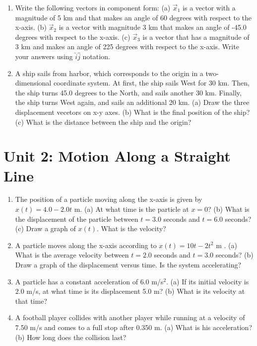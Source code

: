\documentclass[10pt]{article}
\begin{document}
\begin{enumerate}
\item Write the following vectors in component form: (a) $\vec{x}_1$ is a vector with a magnitude of 5 km and that makes an angle of 60 degrees with respect to the x-axis. (b) $\vec{x}_2$ is a vector with magnitude 3 km that makes an angle of -45.0 degrees with respect to the x-axis. (c) $\vec{x}_3$ is a vector that has a magnitude of 3 km and makes an angle of 225 degrees with respect to the x-axis.  Write your answers using $\hat{i} \hat{j}$ notation.  \\ \vspace{3cm}
\item A ship sails from harbor, which corresponds to the origin in a two-dimensional coordinate system.  At first, the ship sails West for 30 km.  Then, the ship turns 45.0 degrees to the North, and sails another 30 km.  Finally, the ship turns West again, and sails an additional 20 km.  (a) Draw the three displacement vecetors on x-y axes.  (b) What is the final position of the ship?  (c) What is the distance between the ship and the origin? \\ \vspace{3cm}
\end{enumerate}

\section{Unit 2: Motion Along a Straight Line}

\begin{enumerate}
\item The position of a particle moving along the x-axis is given by $x(t) = 4.0 - 2.0t$ m. (a) At what time is the particle at $x=0$? (b) What is the displacement of the particle between $t=3.0$ seconds and $t=6.0$ seconds?  (c) Draw a graph of $x(t)$.  What is the velocity? \\ \vspace{2cm}
\item A particle moves along the x-axis according to $x(t) = 10t - 2t^2$ m . (a) What is the average velocity between $t=2.0$ seconds and $t=3.0$ seconds? (b) Draw a graph of the displacement versus time.  Is the system accelerating?  \\ \vspace{3cm}
\item A particle has a constant acceleration of $6.0$ m/s$^2$.  (a) If its initial velocity is 2.0 m/s, at what time is its displacement 5.0 m? (b) What is its velocity at that time? \\ \vspace{2cm}
\item A football player collides with another player while running at a velocity of 7.50 m/s and comes to a full stop after 0.350 m. (a) What is his acceleration? (b) How long does
the collision last? \\ \vspace{3cm}
\end{enumerate}
\end{document}
